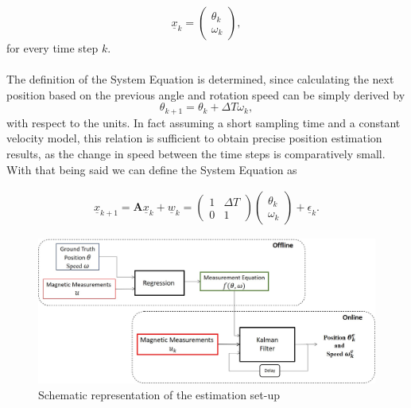 \documentclass[english]{isasthesis}
\begin{document}
    	\begin{equation}
    		\underline{x}_k = \begin{pmatrix} \theta_k \\ \omega_k\end{pmatrix},
    	\end{equation}
    	for every time step $k$. \\\\
    	The definition of the System Equation is determined, since calculating the next position based on the previous angle and rotation speed can be simply derived by
    	\begin{equation}
    		\theta_{k+1} = \theta_k + \Delta T \omega_k,
    	\end{equation}
    	with respect to the units. 
    	In fact assuming a short sampling time and a constant velocity model, this relation is sufficient to obtain precise position estimation results, as the change in speed between the time steps is comparatively small. With that being said we can define the System Equation as 
    	{
    	\begin{align} 
    	\underline{x}_{k+1} = \mathbf{A}\underline{x}_k + \underline{w}_k = \begin{pmatrix}
    	1 & \Delta T\\
    	0 & 1 
    	\end{pmatrix}
    	\begin{pmatrix}
    	\theta_k\\
    	\omega_k
    	\end{pmatrix}
    	+ \underline{\epsilon}_k.\label{eq:realSysEqu}
    	\end{align}
    	
    	\begin{figure}[t]
                \centering
                \includegraphics[width=1\textwidth]{figures/estimation-setup_2.jpg}
                \caption{Schematic representation of the estimation set-up}
                \label{fig:estimation set-up}
     \end{figure}
     }
\end{document}
